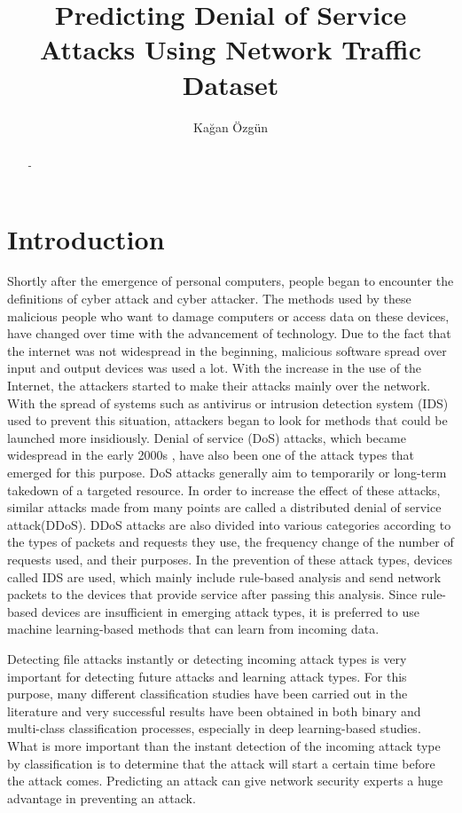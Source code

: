\documentclass{article}
\author{Kağan Özgün}
\title{Predicting Denial of Service Attacks Using Network Traffic Dataset}
\begin{document}
\maketitle

\begin{abstract}
-
\end{abstract}

\section{Introduction}
Shortly after the emergence of personal computers, people began to encounter the definitions of cyber attack and cyber attacker. The methods used by these malicious people who want to damage computers or access data on these devices, have changed over time with the advancement of technology. Due to the fact that the internet was not widespread in the beginning, malicious software spread over input and output devices was used a lot. With the increase in the use of the
Internet, the attackers started to make their attacks mainly over the network. With the spread of systems such as antivirus or intrusion detection system (IDS) used to prevent this situation,
attackers began to look for methods that could be launched more insidiously. Denial of service (DoS) attacks, which became widespread in the early 2000s \cite{Rangapur}, have also been
one of the attack types that emerged for this purpose. DoS attacks generally aim to temporarily or long-term takedown of a targeted resource. In order to increase the effect of these attacks, similar attacks made from many points are called a distributed denial of service attack(DDoS). DDoS
attacks are also divided into various categories according to the types of packets and requests they use, the frequency change of the number of requests used, and their purposes. In the prevention of these attack types, devices called IDS are used, which mainly include rule-based analysis and send network packets to the devices that provide service after passing this analysis. Since rule-based devices are insufficient in emerging attack types, it is preferred to use machine learning-based methods that can learn from incoming data.

Detecting file attacks instantly or detecting incoming attack types is very important for detecting future attacks and learning attack types. For this purpose, many different classification studies have been carried out in the literature and very successful results have been obtained in both binary and multi-class classification processes, especially in deep learning-based studies. What is more important than the instant detection of the incoming attack type by classification is to determine that the attack will start a certain time before the attack comes. Predicting an attack can give network security experts a huge advantage in preventing an attack.
\end{document}
